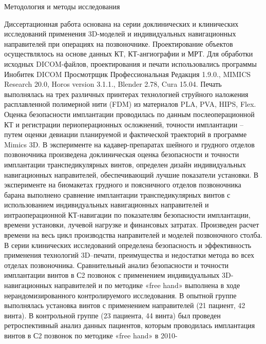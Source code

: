 
Методология и методы исследования

Диссертационная работа основана на серии доклинических и клинических
исследований применения 3D-моделей и индивидуальных навигационных
направителей при операциях на позвоночнике. Проектирование объектов
осуществлялось на основе данных КТ, КТ-ангиографии и МРТ. Для обработки
исходных DICOM-файлов, проектирования и печати использовались программы
Инобитек DICOM Просмотрщик Профессиональная Редакция 1.9.0., MIMICS
Research 20.0, Horos version 3.1.1., Blender 2.78, Cura 15.04. Печать выполнялась
на трех различных принтерах технологией струйного наложения расплавленной
полимерной нити (FDM) из материалов PLA, PVA, HIPS, Flex.
     Оценка       безопасности   имплантации      проводилась      по    данным
послеоперационной КТ и регистрации периоперационных осложнений, точности
имплантации – путем оценки девиации планируемой и фактической траекторий в
программе Mimics 3D.
     В эксперименте на кадавер-препаратах шейного и грудного отделов
позвоночника произведена доклиническая оценка безопасности и точности
имплантации транспедикулярных винтов, определен дизайн индивидуальных
навигационных направителей, обеспечивающий лучшие показатели установки.
     В   эксперименте    на   биомакетах    грудного   и   поясничного   отделов
позвоночника барана выполнено сравнение имплантации транспедикулярных
винтов с использованием индивидуальных навигационных направителей и
интраоперационной КТ-навигации по показателям безопасности имплантации,
времени установки, лучевой нагрузке и финансовых затратах. Произведен расчет
времени на весь цикл производства направителей и моделей позвоночного столба.
     В    серии    клинических   исследований     определена    безопасность   и
эффективность применения технологий 3D–печати, преимущества и недостатки
метода во всех отделах позвоночника.
     Сравнительный анализ безопасности и точности имплантации винтов в С2
позвонок с применением индивидуальных 3D-навигационных направителей и по
методике «free hand» выполнена в ходе нерандомизированного контролируемого
исследования. В опытной группе выполнялась установка винтов с применением
направителей (21 пациент, 42 винта). В контрольной группе (23 пациента, 44
винта) был проведен ретроспективный анализ данных пациентов, которым
проводилась имплантация винтов в С2 позвонок по методике «free hand» в 2010-
